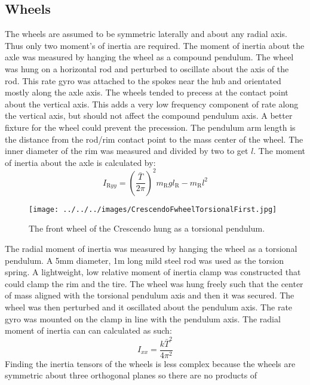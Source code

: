 \documentclass{bmd2010p}
\begin{document}
\subsection{Wheels}
The wheels are assumed to be symmetric laterally and about any radial axis. Thus only two
moment's of inertia are required. The moment of inertia about the axle was
measured by hanging the wheel as a compound pendulum. The wheel was hung on a
horizontal rod and perturbed to oscillate about the axis of the rod. This rate
gyro was attached to the spokes near the hub and orientated mostly along the
axle axis. The wheels tended to precess at the contact point about the vertical
axis. This adds a very low frequency component of rate along the vertical axis,
but should not affect the compound pendulum axis. A better fixture for the
wheel could prevent the precession. The pendulum arm length is the distance
from the rod/rim contact point to the mass center of the wheel. The inner
diameter of the rim was measured and divided by two to get $l$. The moment of
inertia about the axle is calculated by:
\begin{equation}
    I_{\mathrm{R}yy} = \left(\frac{\bar{T}}{2\pi}\right)^2m_\mathrm{R}gl_\mathrm{R} -
    m_\mathrm{R}l^2
\end{equation}
\begin{figure}[htbp]
    \begin{center}
        \texttt{[image: ../../../images/CrescendoFwheelTorsionalFirst.jpg]}
    \end{center}
    \caption{The front wheel of the Crescendo hung as a torsional pendulum.}
    \label{fig:FwheelTor}
\end{figure}
The radial moment of inertia was measured by hanging the wheel as a torsional
pendulum. A 5mm diameter, 1m long mild steel rod was used as the torsion
spring. A lightweight, low relative moment of inertia clamp was constructed
that could clamp the rim and the tire. The wheel was hung freely such that the
center of mass aligned with the torsional pendulum axis and then it was
secured. The wheel was then perturbed and it oscillated about the pendulum axis.
The rate gyro was mounted on the clamp in line with the pendulum axis. The
radial moment of inertia can can calculated as such:
\begin{equation}
    I_{xx} = \frac{k\bar{T}^2}{4\pi^2}
\end{equation}
Finding the inertia tensors of the wheels is less complex because the wheels
are symmetric about three orthogonal planes so there are no products of
\end{document}
